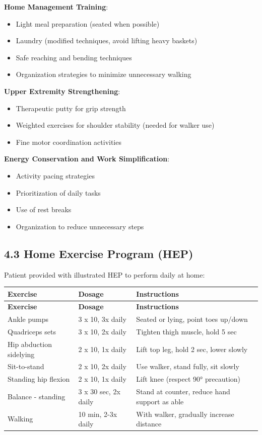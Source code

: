 \documentclass[11pt,letterpaper]{article}
\begin{document}
\textbf{Home Management Training}:
\begin{itemize}[leftmargin=*]
    \item Light meal preparation (seated when possible)
    \item Laundry (modified techniques, avoid lifting heavy baskets)
    \item Safe reaching and bending techniques
    \item Organization strategies to minimize unnecessary walking
\end{itemize}

\textbf{Upper Extremity Strengthening}:
\begin{itemize}[leftmargin=*]
    \item Therapeutic putty for grip strength
    \item Weighted exercises for shoulder stability (needed for walker use)
    \item Fine motor coordination activities
\end{itemize}

\textbf{Energy Conservation and Work Simplification}:
\begin{itemize}[leftmargin=*]
    \item Activity pacing strategies
    \item Prioritization of daily tasks
    \item Use of rest breaks
    \item Organization to reduce unnecessary steps
\end{itemize}

\subsection*{4.3 Home Exercise Program (HEP)}

Patient provided with illustrated HEP to perform daily at home:

\begin{longtable}{|p{4cm}|p{4cm}|p{5cm}|}
\hline
\textbf{Exercise} & \textbf{Dosage} & \textbf{Instructions} \\ \hline
\endfirsthead
\hline
\textbf{Exercise} & \textbf{Dosage} & \textbf{Instructions} \\ \hline
\endhead
Ankle pumps & 3 x 10, 3x daily & Seated or lying, point toes up/down \\ \hline
Quadriceps sets & 3 x 10, 2x daily & Tighten thigh muscle, hold 5 sec \\ \hline
Hip abduction sidelying & 2 x 10, 1x daily & Lift top leg, hold 2 sec, lower slowly \\ \hline
Sit-to-stand & 2 x 10, 2x daily & Use walker, stand fully, sit slowly \\ \hline
Standing hip flexion & 2 x 10, 1x daily & Lift knee (respect 90° precaution) \\ \hline
Balance - standing & 3 x 30 sec, 2x daily & Stand at counter, reduce hand support as able \\ \hline
Walking & 10 min, 2-3x daily & With walker, gradually increase distance \\ \hline
\end{longtable}
\end{document}
